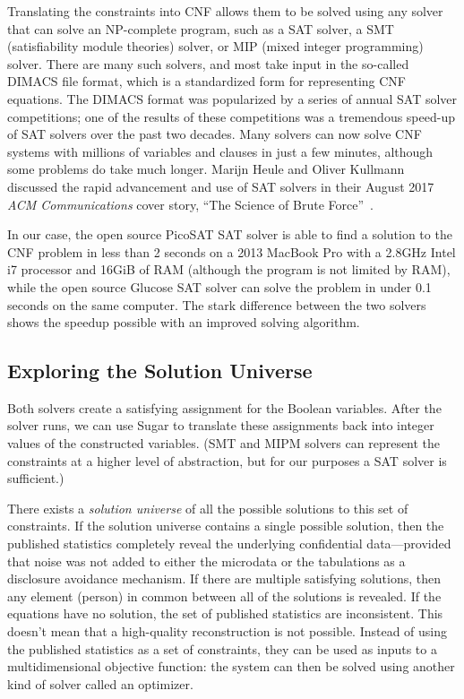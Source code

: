 \documentclass[runningheads]{llncs}
\begin{document}
Translating the constraints into CNF allows them to be solved using
any solver that can solve an NP-complete program, such as a SAT
solver, a SMT (satisfiability module theories) solver,
or MIP (mixed integer programming) solver. There are many such
solvers, and most take input in the so-called DIMACS file
format, which is a standardized form for representing CNF equations. 
The DIMACS format was popularized by a series of annual SAT solver
competitions; one of the results of these competitions was a
tremendous speed-up of SAT solvers over the past two decades. Many
solvers can now solve CNF systems with millions of variables and
clauses in just a few minutes, although some problems do take much
longer. Marijn Heule and Oliver Kullmann discussed the rapid
advancement and use of SAT solvers in their August 2017 \emph{ACM Communications}
cover story, ``The Science of Brute Force''~\cite{Heule:2017:SBF:3127343.3107239}.

In our case, the open source
PicoSAT\cite{Biere_picosatessentials} SAT solver is able to find a
solution to the CNF problem in less than 2 seconds on a 2013 MacBook
Pro with a 2.8GHz Intel i7 processor and 16GiB of RAM (although the
program is not limited by RAM), while the open source Glucose SAT solver
can solve the problem in under 0.1 seconds on the same computer. The
stark difference between the two solvers shows the speedup possible
with an improved solving algorithm. 

\subsection{Exploring the Solution Universe}

Both solvers create a satisfying assignment for the \NumVariables{}
Boolean variables. After the solver runs, we can use Sugar to translate
these assignments back into integer values of the constructed
variables. (SMT and MIPM solvers can represent the constraints at a higher
level of abstraction, but for our purposes a SAT solver is
sufficient.)

There exists a \textit{solution universe} of all the possible
solutions to this set of constraints. If the solution
universe contains a single possible solution, then the published
statistics completely reveal the underlying confidential
data---provided that noise was not added to either the microdata or
the tabulations as a disclosure avoidance mechanism. If
there are multiple satisfying solutions, then any element (person) in
common between all of the solutions is revealed. If the equations have
no solution, the set of published statistics are inconsistent. This
doesn't mean that a high-quality reconstruction is not
possible. Instead of using the published statistics as a set of
constraints, they can be used as inputs to a multidimensional
objective function: the system can then be solved using another kind
of solver called an optimizer.
\end{document}
